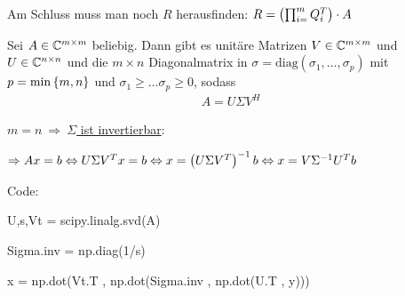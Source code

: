Am Schluss muss man noch $R$ herausfinden:
$R = \left( \prod_{i=}^{m} Q_{i}^T \right) \cdot A$

\vspace{1\baselineskip}

\underline{}

Sei $A \in \mathbb{C}^{m \times m}$ beliebig. Dann gibt es unitäre Matrizen $V \in \mathbb{C}^{m \times m}$
und $U \in \mathbb{C}^{n \times n}$ und die $m \times n$ Diagonalmatrix in $\sigma = \text{diag}
(\sigma_1 , \dots , \sigma_p)$ mit $p= \min \left\{ m,n \right\}$ und
$\sigma_1 \geq \dots \sigma_p \geq 0$, sodass
\begin{align*}
    A = U \Sigma V^H
\end{align*}

\underline{$m=n \ \Rightarrow \ \Sigma$ ist invertierbar}:

$\Rightarrow Ax=b \Leftrightarrow U \Sigma V^T x = b \Leftrightarrow x = \left( U \Sigma V^T \right)^{-1} b
\Leftrightarrow x = V \Sigma^{-1} U^T b$

Code:

U,s,Vt = scipy.linalg.svd(A)

Sigma.inv = np.diag(1/s)

x = np.dot(Vt.T , np.dot(Sigma.inv , np.dot(U.T , y)))

\vspace{1\baselineskip}

